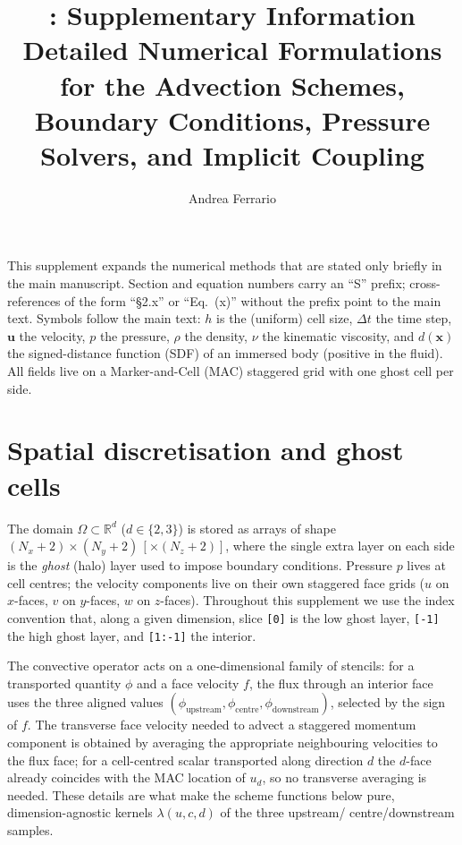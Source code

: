 \documentclass[10pt,onecolumn]{article}
\title{\lilytorch: Supplementary Information\\[2pt]
\large Detailed Numerical Formulations for the Advection Schemes,
Boundary Conditions, Pressure Solvers, and Implicit Coupling}
\author{Andrea Ferrario}
\date{}
\begin{document}
\maketitle

\noindent
This supplement expands the numerical methods that are stated only
briefly in the main manuscript.  Section and equation numbers carry an
``S'' prefix; cross-references of the form ``\S2.x'' or ``Eq.~(x)''
without the prefix point to the main text.  Symbols follow the main
text: $h$ is the (uniform) cell size, $\Delta t$ the time step,
$\mathbf u$ the velocity, $p$ the pressure, $\rho$ the density, $\nu$
the kinematic viscosity, and $d(\mathbf x)$ the signed-distance
function (SDF) of an immersed body (positive in the fluid).  All fields
live on a Marker-and-Cell (MAC) staggered grid with one ghost cell per
side.


\section{Spatial discretisation and ghost cells}\label{sec:s-grid}

The domain $\Omega\subset\mathbb R^{d}$ ($d\in\{2,3\}$) is stored as
arrays of shape $(N_x{+}2)\times(N_y{+}2)\,[\times(N_z{+}2)]$, where the
single extra layer on each side is the \emph{ghost} (halo) layer used to
impose boundary conditions.  Pressure $p$ lives at cell centres; the
velocity components live on their own staggered face grids ($u$ on
$x$-faces, $v$ on $y$-faces, $w$ on $z$-faces).  Throughout this
supplement we use the index convention that, along a given dimension,
slice \texttt{[0]} is the low ghost layer, \texttt{[-1]} the high ghost
layer, and \texttt{[1:-1]} the interior.

The convective operator acts on a one-dimensional family of stencils:
for a transported quantity $\phi$ and a face velocity
$f$, the flux through an interior face uses the three aligned values
$(\phi_{\text{upstream}},\phi_{\text{centre}},\phi_{\text{downstream}})$,
selected by the sign of $f$.  The transverse face velocity needed to
advect a staggered momentum component is obtained by averaging the
appropriate neighbouring velocities to the flux face; for a
cell-centred scalar transported along direction $d$ the $d$-face already
coincides with the MAC location of $u_d$, so no transverse averaging is
needed.  These details are what make the scheme functions below pure,
dimension-agnostic kernels $\lambda(u,c,d)$ of the three upstream/
centre/downstream samples.
\end{document}
